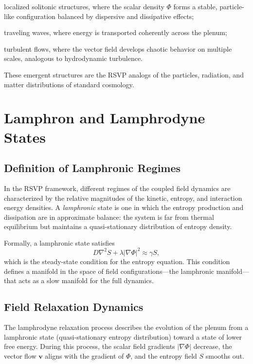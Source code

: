 \documentclass[12pt,a4paper,oneside]{book}
\theoremstyle{definition}
\theoremstyle{plain}
\theoremstyle{remark}
\begin{document}
localized solitonic structures, where the scalar density $\Phi$ forms a
stable, particle-like configuration balanced by dispersive and dissipative
effects;

traveling waves, where energy is transported coherently across the plenum;

turbulent flows, where the vector field develops chaotic behavior on
multiple scales, analogous to hydrodynamic turbulence.

These emergent structures are the RSVP analogs of the particles, radiation,
and matter distributions of standard cosmology.

\chapter{Lamphron and Lamphrodyne States}

\section{Definition of Lamphronic Regimes}

In the RSVP framework, different regimes of the coupled field dynamics are
characterized by the relative magnitudes of the kinetic, entropy, and
interaction energy densities. A \emph{lamphronic} state is one in which the
entropy production and dissipation are in approximate balance: the system
is far from thermal equilibrium but maintains a quasi-stationary distribution
of entropy density.

Formally, a lamphronic state satisfies
\begin{equation}
D\nabla^2 S + \lambda|\nabla\Phi|^2 \approx \gamma S,
\end{equation}
which is the steady-state condition for the entropy equation. This condition
defines a manifold in the space of field configurations---the lamphronic
manifold---that acts as a slow manifold for the full dynamics.

\section{Field Relaxation Dynamics}

The lamphrodyne relaxation process describes the evolution of the plenum
from a lamphronic state (quasi-stationary entropy distribution) toward a
state of lower free energy. During this process, the scalar field gradients
$|\nabla\Phi|$ decrease, the vector flow $\mathbf{v}$ aligns with the
gradient of $\Phi$, and the entropy field $S$ smooths out.
\end{document}
